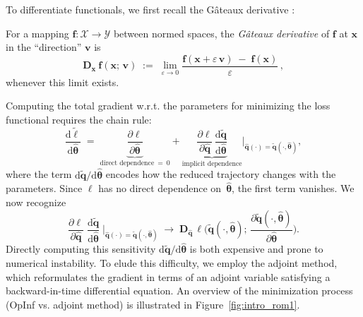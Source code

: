 To differentiate functionals, we first recall the Gâteaux derivative \cite{bonnans2013perturbation}:\\
\begin{definition}
    For a mapping $\mathbf{f}: \mathcal{X}\to\mathcal{Y}$ between normed spaces, the \emph{Gâteaux derivative} of $\mathbf{f}$ at $\mathbf{x}$ in the “direction” $\mathbf{v}$ is\\
    $$\bm{D}_{\mathbf{x}}~\mathbf{f}(\mathbf{x};\,\mathbf{v})
  \;:=\;
  \lim_{\varepsilon\to0}
    \frac{\mathbf{f}(\mathbf{x} + \varepsilon\,\mathbf{v})
           \;-\;\mathbf{f}(\mathbf{x})}
         {\varepsilon}\,,$$
    whenever this limit exists.
\end{definition}
Computing the total gradient w.r.t. the parameters for minimizing the loss functional requires the chain rule:\\
\begin{equation}
  \frac{\mathrm{d}\tilde{\ell}}{\mathrm{d}\hat{\bm{\theta}}}
  \;=\;
  \underbrace{\frac{\partial \ell}{\partial \hat{\bm{\theta}}}}_{\text{direct dependence} ~=~0}
  + 
  \underbrace{\frac{\partial \ell}{\partial \hat{\mathbf{q}}}\,
                \frac{\mathrm{d} \tilde{\mathbf{q}}}{\mathrm{d} \hat{\bm{\theta}}}
               }_{\text{implicit dependence}} \Bigg\vert_{\hat{\mathbf{q}}(\cdot) = \tilde{\mathbf{q}}(\cdot, \hat{\bm{\theta}} ) },
    \label{eq:l_gradient}
\end{equation}
where the term $\mathrm{d} \tilde{\mathbf{q}}/\mathrm{d} \hat{\bm{\theta}}$ encodes how the reduced trajectory changes with the parameters. Since $\ell$ has no direct dependence on~$\hat{\bm{\theta}}$, the first term vanishes. We now recognize\\
$$\frac{\partial \ell}{\partial \hat{\mathbf{q}}}
    \;\frac{\mathrm{d}\tilde{\mathbf{q}}}{\mathrm{d}\hat{\bm{\theta}}}
  \;\Bigg\vert_{\hat{\mathbf{q}}(\cdot)=\tilde{\mathbf{q}}(\cdot, \hat{\bm{\theta}})}
  \;\longrightarrow\;
  \bm{D}_{\hat{\mathbf{q}}}\,\ell\biggl(\tilde{\mathbf{q}}(\cdot,\hat{\bm{\theta}});\,
    \dfrac{\partial\tilde{\mathbf{q}}(\cdot,\hat{\bm{\theta}})}{\partial\hat{\bm{\theta}}}
  \biggr).$$
Directly computing this sensitivity $\mathrm{d} \tilde{\mathbf{q}}/\mathrm{d} \hat{\bm{\theta}}$ is both expensive and prone to numerical instability.  To elude this difficulty, we employ the adjoint method, which reformulates the gradient in terms of an adjoint variable satisfying a backward-in-time differential equation. An overview of the minimization process (OpInf vs. adjoint method) is illustrated in Figure~\ref{fig:intro_rom1}.

